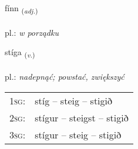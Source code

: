 \documentclass[frontgrid, backgrid]{flacards}\usepackage[]{graphicx}\usepackage[]{xcolor}
\begin{document}
\renewcommand{\flhead}{\vskip5pt \fboxsep=0pt {\small\bfseries\footnotesize Lýsingarorð | Adjective}}
\renewcommand{\fcfoot}{\vskip5pt \fboxsep=0pt \hspace{2pt}{\small\bfseries\footnotesize 2K}}

\renewcommand{\blhead}{\vskip5pt {\small\bfseries\footnotesize Lýsingarorð | Adjective }}
\renewcommand{\bcfoot}{\vskip5pt \hspace{2pt}{\small\bfseries\footnotesize 2K}}


{fínn \small{\textsubscript{(\textit{adj.})}} \\[1ex] %
\textphonetic{[fitn̥]} \\
pl.: \emph{w porządku} \\  [2ex]
\renewcommand*{\arraystretch}{0.8}
}

\renewcommand{\flhead}{\vskip5pt \fboxsep=0pt {\small\bfseries\footnotesize Sagnorð | Verb}}
\renewcommand{\fcfoot}{\vskip5pt \fboxsep=0pt \hspace{2pt}{\small\bfseries\footnotesize 2K}}

\renewcommand{\blhead}{\vskip5pt {\small\bfseries\footnotesize Sagnorð | Verb }}
\renewcommand{\bcfoot}{\vskip5pt \hspace{2pt}{\small\bfseries\footnotesize 2K}}


{stíga \small{\textsubscript{(\textit{v.})}} \\[1ex] %
\textphonetic{[stiːɣa]} \\
pl.: \emph{nadepnąć; powstać, zwiększyć} \\  [2ex]
\renewcommand*{\arraystretch}{0.8}
\begin{tabular}{p{1cm}l}
\textsc{1sg}: & stíg -- steig -- stigið \\ 
\textsc{2sg}: & stígur -- steigst -- stigið \\ 
\textsc{3sg}: & stígur -- steig -- stigið \\ 
\end{tabular}
}
\end{document}
